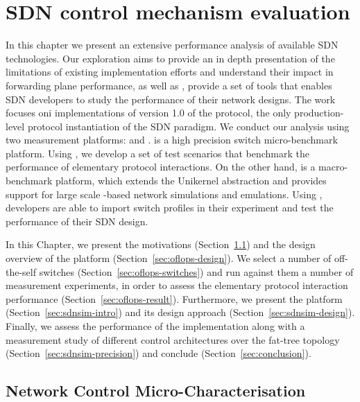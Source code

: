 \chapter{SDN control mechanism evaluation}
\ifpdf
    \graphicspath{{Chapter1/Chapter1Figs/PNG/}{Chapter1/Chapter1Figs/PDF/}{Chapter1/Chapter1Figs/}}
\else
    \graphicspath{{Chapter1/Chapter1Figs/EPS/}{Chapter1/Chapter1Figs/}}
\fi

In this chapter we present an extensive performance analysis of available SDN
technologies. Our exploration aims to provide an in depth presentation of the
limitations of existing implementation efforts and understand their impact in
forwarding plane performance, as well as , provide a set of tools that enables
SDN developers to study the performance of their network designs. The work
focuses oni implementations of version 1.0 of the \of protocol, the only
production-level protocol instantiation of the SDN paradigm.  We conduct our
analysis using two measurement platforms: \oflops and \sdnsim.  \oflops is a
high precision \of switch micro-benchmark platform. Using \oflops, we develop a
set of test scenarios that benchmark the performance of elementary \of protocol
interactions. On the other hand, \sdnsim is a macro-benchmark \of platform,
which extends the Unikernel abstraction and provides support for large scale
\of-based network simulations and emulations. Using \sdnsim, developers are able
to import \oflops switch profiles in their experiment and test the
performance of their SDN design.

In this Chapter, we present the motivations (Section~\ref{sec:oflops-intro}) and
the design overview of the \oflops platform (Section~\ref{sec:oflops-design}).
We select a number of off-the-self \of switches
(Section~\ref{sec:oflops-switches}) and run against them a number of measurement
experiments, in order to assess the elementary protocol interaction performance
(Section~\ref{sec:oflops-result}). Furthermore, we present the \sdnsim platform
(Section~\ref{sec:sdnsim-intro}) and its design approach
(Section~\ref{sec:sdnsim-design}). Finally, we assess the performance of the
\sdnsim implementation along with a measurement study of different control
architectures over the fat-tree topology (Section~\ref{sec:sdnsim-precision})
and conclude (Section~\ref{sec:conclusion}). 

\section{Network Control Micro-Characterisation} \label{sec:oflops-intro}

